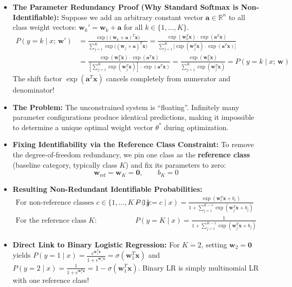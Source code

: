 \documentclass[10pt,a4paper]{article}
\begin{document}
\begin{itemize}[leftmargin=12pt, itemsep=0.5pt, parsep=0pt, topsep=0.5pt]
    \item \textbf{The Parameter Redundancy Proof (Why Standard Softmax is Non-Identifiable):}
    Suppose we add an arbitrary constant vector $\mathbf{a} \in \mathbb{R}^n$ to all class weight vectors: $\mathbf{w}_k' = \mathbf{w}_k + \mathbf{a}$ for all $k \in \{1, \dots, K\}$.
    \begin{align*}
    P(y = k \mid x;\, \mathbf{w}') &= \frac{\exp\big((\mathbf{w}_k + \mathbf{a})^T \mathbf{x}\big)}{\sum_{j=1}^K \exp\big((\mathbf{w}_j + \mathbf{a})^T \mathbf{x}\big)} = \frac{\exp(\mathbf{w}_k^T \mathbf{x}) \cdot \exp(\mathbf{a}^T \mathbf{x})}{\sum_{j=1}^K \big[ \exp(\mathbf{w}_j^T \mathbf{x}) \cdot \exp(\mathbf{a}^T \mathbf{x}) \big]} \\
    &= \frac{\exp(\mathbf{w}_k^T \mathbf{x}) \cdot \exp(\mathbf{a}^T \mathbf{x})}{\left[\sum_{j=1}^K \exp(\mathbf{w}_j^T \mathbf{x})\right] \cdot \exp(\mathbf{a}^T \mathbf{x})} = \frac{\exp(\mathbf{w}_k^T \mathbf{x})}{\sum_{j=1}^K \exp(\mathbf{w}_j^T \mathbf{x})} = P(y = k \mid x;\, \mathbf{w})
    \end{align*}
    The shift factor $\exp(\mathbf{a}^T \mathbf{x})$ cancels completely from numerator and denominator!
    \item \textbf{The Problem:} The unconstrained system is ``floating''. Infinitely many parameter configurations produce identical predictions, making it impossible to determine a unique optimal weight vector $\theta^*$ during optimization.
    \item \textbf{Fixing Identifiability via the Reference Class Constraint:}
    To remove the degree-of-freedom redundancy, we pin one class as the \textbf{reference class} (baseline category, typically class $K$) and fix its parameters to zero:
    \[
    \mathbf{w}_{\text{ref}} = \mathbf{w}_K = \mathbf{0}, \qquad b_K = 0
    \]
    \item \textbf{Resulting Non-Redundant Identifiable Probabilities:}
    \begin{align*}
        \text{For non-reference classes } c \in \{1, \dots, K-1\}: \qquad & P(y = c \mid x) = \frac{\exp(\mathbf{w}_c^T \mathbf{x} + b_c)}{1 + \sum_{j=1}^{K-1} \exp(\mathbf{w}_j^T \mathbf{x} + b_j)} \\[3pt]
        \text{For the reference class } K: \qquad & P(y = K \mid x) = \frac{1}{1 + \sum_{j=1}^{K-1} \exp(\mathbf{w}_j^T \mathbf{x} + b_j)}
    \end{align*}
    \item \textbf{Direct Link to Binary Logistic Regression:} For $K = 2$, setting $\mathbf{w}_2 = \mathbf{0}$ yields $P(y=1\mid x) = \frac{e^{\mathbf{w}_1^T \mathbf{x}}}{1 + e^{\mathbf{w}_1^T \mathbf{x}}} = \sigma(\mathbf{w}_1^T \mathbf{x})$ and $P(y=2\mid x) = \frac{1}{1 + e^{\mathbf{w}_1^T \mathbf{x}}} = 1 - \sigma(\mathbf{w}_1^T \mathbf{x})$. Binary LR is simply multinomial LR with one reference class!
\end{itemize}
\vspace{2pt}
\end{document}
